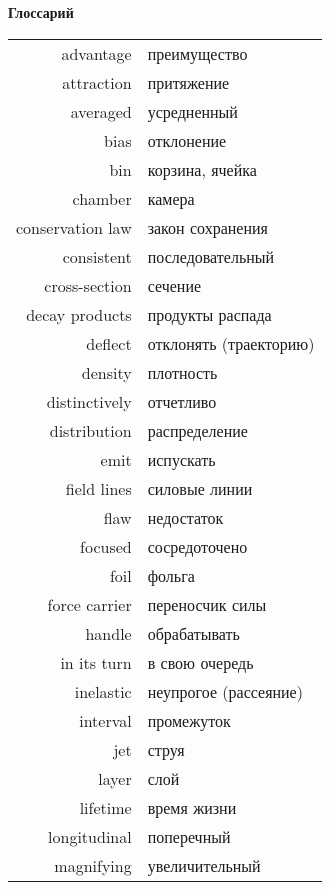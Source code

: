 \documentclass[12pt, a4paper]{article}
\begin{document}
\clearpage

\begin{center}
\bf Глоссарий
\end{center}

\begin{multicols}{2}\centering

\begin{tabular}{rl}
	advantage & преимущество \\
	attraction & притяжение \\
	averaged & усредненный \\
	bias & отклонение \\
	bin & корзина, ячейка \\
	chamber & камера \\
	conservation law & закон сохранения \\
	consistent & последовательный \\
	cross-section & сечение \\
	decay products & продукты распада\\
	deflect & отклонять (траекторию) \\
	density & плотность \\
	distinctively & отчетливо\\
	distribution & распределение \\
	emit & испускать \\
	field lines & силовые линии\\
	flaw & недостаток \\
	focused & сосредоточено \\
	foil & фольга\\
	force carrier & переносчик силы \\
	handle & обрабатывать \\
	in its turn & в свою очередь \\
	inelastic & неупрогое (рассеяние)\\
	interval & промежуток\\
	jet & струя\\
	layer & слой \\
	lifetime & время жизни \\
	longitudinal & поперечный \\
	magnifying & увеличительный \\

\end{tabular}


\end{multicols}
\end{document}
